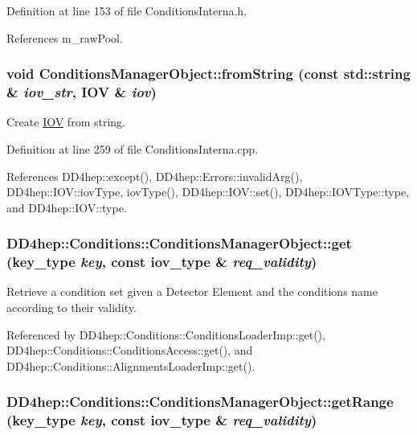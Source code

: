 Definition at line 153 of file ConditionsInterna.h.

References m\_\-rawPool.\hypertarget{class_d_d4hep_1_1_conditions_1_1_conditions_manager_object_a9ff0d68cbe3771a7a9354bdf518ddd11}{
\subsubsection[{fromString}]{\setlength{\rightskip}{0pt plus 5cm}void ConditionsManagerObject::fromString (const std::string \& {\em iov\_\-str}, \/  {\bf IOV} \& {\em iov})}}
\label{class_d_d4hep_1_1_conditions_1_1_conditions_manager_object_a9ff0d68cbe3771a7a9354bdf518ddd11}


Create \hyperlink{class_d_d4hep_1_1_i_o_v}{IOV} from string. 

Definition at line 259 of file ConditionsInterna.cpp.

References DD4hep::except(), DD4hep::Errors::invalidArg(), DD4hep::IOV::iovType, iovType(), DD4hep::IOV::set(), DD4hep::IOVType::type, and DD4hep::IOV::type.\hypertarget{class_d_d4hep_1_1_conditions_1_1_conditions_manager_object_aa2b1c984fdda098cfbaba3e9ed09accd}{
\subsubsection[{get}]{ DD4hep::Conditions::ConditionsManagerObject::get ({\bf key\_\-type} {\em key}, \/  const {\bf iov\_\-type} \& {\em req\_\-validity})}}
\label{class_d_d4hep_1_1_conditions_1_1_conditions_manager_object_aa2b1c984fdda098cfbaba3e9ed09accd}


Retrieve a condition set given a Detector Element and the conditions name according to their validity. 

Referenced by DD4hep::Conditions::ConditionsLoaderImp::get(), DD4hep::Conditions::ConditionsAccess::get(), and DD4hep::Conditions::AlignmentsLoaderImp::get().\hypertarget{class_d_d4hep_1_1_conditions_1_1_conditions_manager_object_ac1c07dfc605bd517d4edfcca2c4bd21a}{
\subsubsection[{getRange}]{ DD4hep::Conditions::ConditionsManagerObject::getRange ({\bf key\_\-type} {\em key}, \/  const {\bf iov\_\-type} \& {\em req\_\-validity})}}
\label{class_d_d4hep_1_1_conditions_1_1_conditions_manager_object_ac1c07dfc605bd517d4edfcca2c4bd21a}


